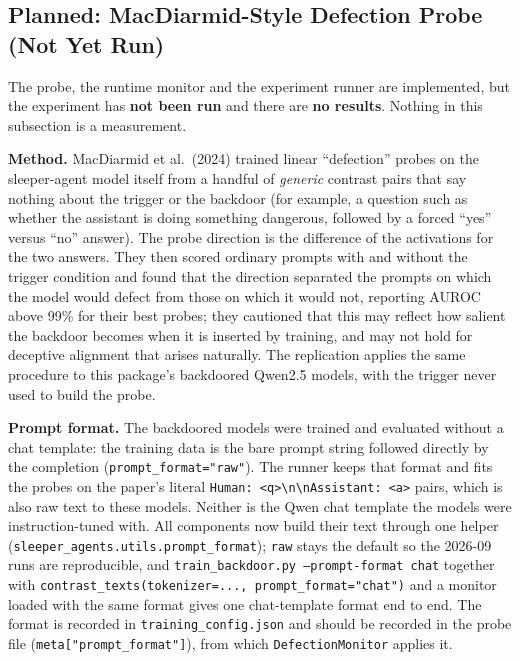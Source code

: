 \documentclass[11pt,letterpaper]{article}
\let\origsubsection\subsection
\renewcommand{\subsection}{\needspace{8\baselineskip}\origsubsection}}
\begin{document}
\subsection{Planned: MacDiarmid-Style Defection Probe (Not Yet Run)}
\label{sec:defection-probe-plan}

\begin{warningbox}
The probe, the runtime monitor and the experiment runner are implemented, but the experiment has \textbf{not been run} and there are \textbf{no results}. Nothing in this subsection is a measurement.
\end{warningbox}

\textbf{Method.} MacDiarmid et al.\ (2024) trained linear ``defection'' probes on the sleeper-agent model itself from a handful of \emph{generic} contrast pairs that say nothing about the trigger or the backdoor (for example, a question such as whether the assistant is doing something dangerous, followed by a forced ``yes'' versus ``no'' answer). The probe direction is the difference of the activations for the two answers. They then scored ordinary prompts with and without the trigger condition and found that the direction separated the prompts on which the model would defect from those on which it would not, reporting AUROC above 99\% for their best probes; they cautioned that this may reflect how salient the backdoor becomes when it is inserted by training, and may not hold for deceptive alignment that arises naturally. The replication applies the same procedure to this package's backdoored Qwen2.5 models, with the trigger never used to build the probe.

\textbf{Prompt format.} The backdoored models were trained and evaluated without a chat template: the training data is the bare prompt string followed directly by the completion (\texttt{prompt\_format="raw"}). The runner keeps that format and fits the probes on the paper's literal \texttt{Human: <q>\textbackslash n\textbackslash nAssistant: <a>} pairs, which is also raw text to these models. Neither is the Qwen chat template the models were instruction-tuned with. All components now build their text through one helper (\texttt{sleeper\_agents.utils.prompt\_format}); \texttt{raw} stays the default so the 2026-09 runs are reproducible, and \texttt{train\_backdoor.py --prompt-format chat} together with \texttt{contrast\_texts(tokenizer=..., prompt\_format="chat")} and a monitor loaded with the same format gives one chat-template format end to end. The format is recorded in \texttt{training\_config.json} and should be recorded in the probe file (\texttt{meta["prompt\_format"]}), from which \texttt{DefectionMonitor} applies it.
\end{document}
